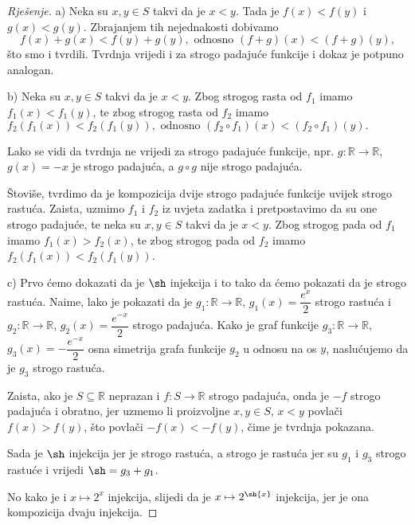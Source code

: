 \begin{proof}[Rješenje]
a) Neka su $x, y\in S$ takvi da je $x<y$. Tada je $f(x)<f(y)$ i $g(x)<g(y)$. Zbrajanjem tih nejednakosti dobivamo
$$f(x)+g(x)<f(y)+g(y),\text{ odnosno } (f+g)(x)<(f+g)(y),$$
što smo i tvrdili. Tvrdnja vrijedi i za strogo padajuće funkcije i dokaz je potpuno analogan.

b) Neka su $x, y\in S$ takvi da je $x<y$. Zbog strogog rasta od $f_1$ imamo $f_1(x)<f_1(y)$, te zbog strogog rasta od $f_2$ imamo $f_2\left(f_1(x)\right)<f_2\left(f_1(y)\right),\text{ odnosno } (f_2\circ f_1)(x)<(f_2\circ f_1)(y).$

Lako se vidi da tvrdnja ne vrijedi za strogo padajuće funkcije, npr. $g : \mathbb{R}\to \mathbb{R}$, $g(x)=-x$ je strogo padajuća, a $g\circ g$ nije strogo padajuća. 

Štoviše, tvrdimo da je kompozicija dvije strogo padajuće funkcije uvijek strogo rastuća. Zaista, uzmimo $f_1$ i $f_2$ iz uvjeta zadatka i pretpostavimo da su one strogo padajuće, te neka su $x, y\in S$ takvi da je $x<y$. Zbog strogog pada od $f_1$ imamo $f_1(x)>f_2(x)$, te zbog strogog pada od $f_2$ imamo $f_2\left(f_1(x)\right)<f_2\left(f_1(y)\right)$.

c) Prvo ćemo dokazati da je $\sh$ injekcija i to tako da ćemo pokazati da je strogo rastuća. Naime, lako je pokazati da je $g_1 : \mathbb{R}\to \mathbb{R}$, $g_1(x)=\dfrac{e^x}{2}$ strogo rastuća i $g_2 : \mathbb{R}\to \mathbb{R}$, $g_2(x)=\dfrac{e^{-x}}{2}$ strogo padajuća. Kako je graf funkcije $g_3 : \mathbb{R}\to \mathbb{R}$, $g_3(x)= -\dfrac{e^{-x}}{2}$ osna simetrija grafa funkcije $g_2$ u odnosu na os $y$, naslućujemo da je $g_3$ strogo rastuća.

Zaista, ako je $S\subseteq \mathbb{R}$ neprazan i $f : S\to \mathbb{R}$ strogo padajuća, onda je $-f$ strogo padajuća i obratno, jer uzmemo li proizvoljne $x, y\in S$, $x<y$ povlači $f(x)>f(y)$, što povlači $-f(x)<-f(y)$, čime je tvrdnja pokazana. 

Sada je $\sh$ injekcija jer je strogo rastuća, a strogo je rastuća jer su $g_1$ i $g_3$ strogo rastuće i vrijedi $\sh=g_3+g_1$. 

No kako je i $x\mapsto 2^x$ injekcija, slijedi da je $x\mapsto 2^{\sh{x}}$ injekcija, jer je ona kompozicija dvaju injekcija.
\end{proof}
